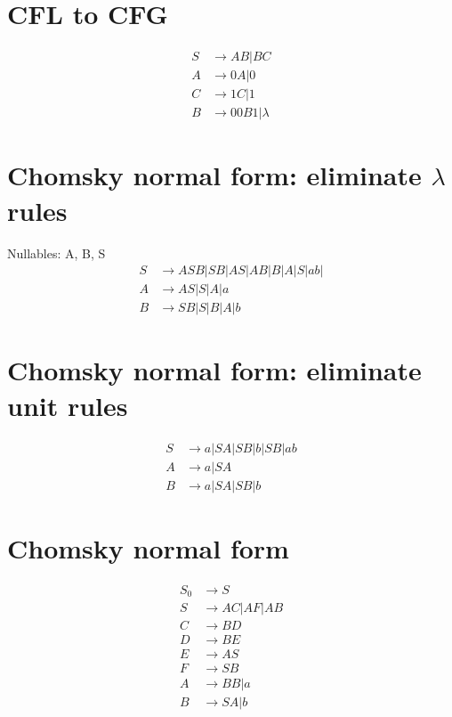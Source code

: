 \documentclass{article}
\begin{document}
\section{CFL to CFG}
\begin{align*}
S &\to AB | BC\\
A &\to 0A | 0\\
C &\to 1C | 1\\
B &\to 00B1 | \lambda
\end{align*}

\section{Chomsky normal form: eliminate $\lambda$ rules}
Nullables: A, B, S
\begin{align*}
S &\to ASB | SB | AS | AB | B | A | S | ab | \\
A &\to AS | S | A | a \\
B &\to SB | S | B | A | b
\end{align*}

\section{Chomsky normal form: eliminate unit rules}
\begin{align*}
S &\to a | SA | SB | b | SB | ab \\
A &\to a | SA \\
B &\to a | SA | SB | b
\end{align*}

\section{Chomsky normal form}
\begin{align*}
S_0 &\to S\\
S &\to AC | AF | AB \\
C &\to BD \\
D &\to BE \\
E &\to AS \\
F &\to SB \\
A &\to BB | a\\
B &\to SA | b
\end{align*}
\end{document}
